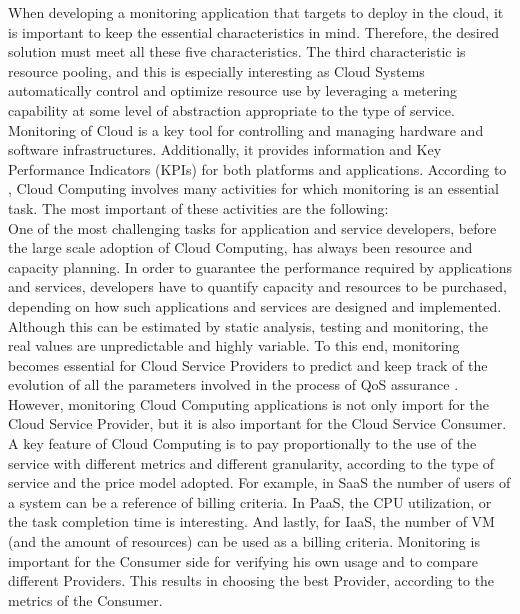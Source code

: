 \noindent
When developing a monitoring application that targets to deploy in the cloud, it is important to keep the essential characteristics in mind. Therefore, the desired solution must meet all these five characteristics. The third characteristic is resource pooling, and this is especially interesting as Cloud Systems automatically control and optimize resource use by leveraging a metering capability at some level of abstraction appropriate to the type of service. Monitoring of Cloud is a key tool for controlling and managing hardware and software infrastructures. Additionally, it provides information and Key Performance Indicators (KPIs) for both platforms and applications. According to \cite{aceto2013cloud}, Cloud Computing involves many activities for which monitoring is an essential task. The most important of these activities are the following:\\

\noindent
One of the most challenging tasks for application and service developers, before the large scale adoption of Cloud Computing, has always been resource and capacity planning. In order to guarantee the performance required by applications and services, developers have to quantify capacity and resources to be purchased, depending on how such applications and services are designed and implemented. Although this can be estimated by static analysis, testing and monitoring, the real values are unpredictable and highly variable. To this end, monitoring becomes essential for Cloud Service Providers to predict and keep track of the evolution of all the parameters involved in the process of QoS assurance \cite{katsaros2011building}.\\

\noindent
However, monitoring Cloud Computing applications is not only import for the Cloud Service Provider, but it is also important for the Cloud Service Consumer. A key feature of Cloud Computing is to pay proportionally to the use of the service with different metrics and different granularity, according to the type of service and the price model adopted. For example, in SaaS the number of users of a system can be a reference of billing criteria. In PaaS, the CPU utilization, or the task completion time is interesting. And lastly, for IaaS, the number of VM (and the amount of resources) can be used as a billing criteria. Monitoring is important for the Consumer side for verifying his own usage and to compare different Providers. This results in choosing the best Provider, according to the metrics of the Consumer.\\

